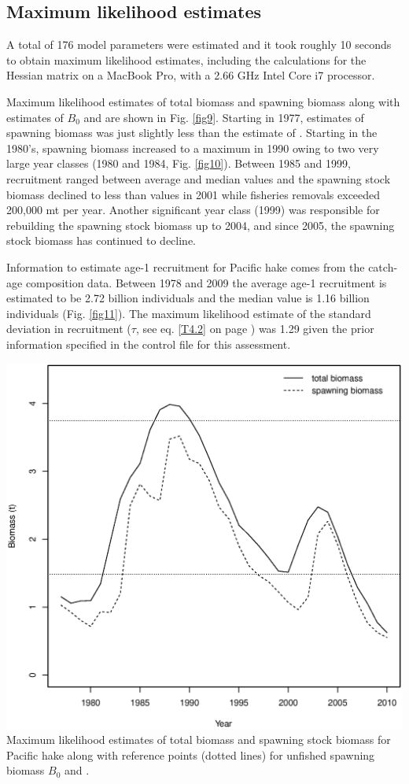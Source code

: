 \begin{multicols}{2}
\subsection{Maximum likelihood estimates}
A total of 176 model parameters were estimated and it took  roughly 10 seconds to obtain maximum likelihood estimates, including the calculations for the Hessian matrix on a MacBook Pro, with a 2.66 GHz Intel Core i7 processor.

Maximum likelihood estimates of total biomass and spawning biomass along with estimates of $B_0$ and \bmsy are shown in Fig. \ref{fig9}.  Starting in 1977, estimates of spawning biomass was just slightly less than the estimate of \bmsy.  Starting in the 1980's, spawning biomass increased to a maximum in 1990 owing to two very large year classes (1980 and 1984, Fig. \ref{fig10}). Between 1985 and 1999, recruitment ranged between average and median values and the spawning stock biomass declined to less than \bmsy values in 2001 while fisheries removals exceeded 200,000 mt per year.  Another significant year class (1999) was responsible for rebuilding the spawning stock biomass up to 2004, and since 2005, the spawning stock biomass has continued to decline.

Information to estimate age-1 recruitment for Pacific hake comes from the catch-age composition data.  Between 1978 and 2009 the average age-1 recruitment is estimated to be 2.72 billion individuals and the median value is 1.16 billion individuals (Fig. \ref{fig11}).  The maximum likelihood estimate of the standard deviation in recruitment ($\tau$, see eq. \ref{T4.2} on page \pageref{tab:statistical_catch_age_model}) was 1.29 given the prior information specified in the control file for this assessment.


\begin{figurehere}
	\centering
	\includegraphics[width=0.9\columnwidth]{iscamFigs/phakefig2.eps}\\
	\caption{Maximum likelihood estimates of total biomass and spawning stock biomass for Pacific hake along with reference points (dotted lines) for unfished spawning biomass $B_0$ and \bmsy.}\label{fig9}
\end{figurehere}



\end{multicols}
